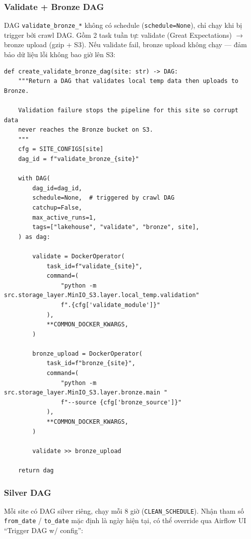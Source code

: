 \subsubsection{Validate + Bronze DAG}

DAG \texttt{validate\_bronze\_*} không có schedule (\texttt{schedule=None}),
chỉ chạy khi bị trigger bởi crawl DAG. Gồm 2 task tuần tự: validate (Great
Expectations) $\to$ bronze upload (gzip + S3). Nếu validate fail, bronze
upload không chạy --- đảm bảo dữ liệu lỗi không bao giờ lên S3:

\begin{lstlisting}[style=pystyle, caption={create\_validate\_bronze\_dag — validate rồi mới upload}]
def create_validate_bronze_dag(site: str) -> DAG:
    """Return a DAG that validates local temp data then uploads to Bronze.

    Validation failure stops the pipeline for this site so corrupt data
    never reaches the Bronze bucket on S3.
    """
    cfg = SITE_CONFIGS[site]
    dag_id = f"validate_bronze_{site}"

    with DAG(
        dag_id=dag_id,
        schedule=None,  # triggered by crawl DAG
        catchup=False,
        max_active_runs=1,
        tags=["lakehouse", "validate", "bronze", site],
    ) as dag:

        validate = DockerOperator(
            task_id=f"validate_{site}",
            command=(
                "python -m src.storage_layer.MinIO_S3.layer.local_temp.validation"
                f".{cfg['validate_module']}"
            ),
            **COMMON_DOCKER_KWARGS,
        )

        bronze_upload = DockerOperator(
            task_id=f"bronze_{site}",
            command=(
                "python -m src.storage_layer.MinIO_S3.layer.bronze.main "
                f"--source {cfg['bronze_source']}"
            ),
            **COMMON_DOCKER_KWARGS,
        )

        validate >> bronze_upload

    return dag
\end{lstlisting}

\subsubsection{Silver DAG}

Mỗi site có DAG silver riêng, chạy mỗi 8 giờ (\texttt{CLEAN\_SCHEDULE}).
Nhận tham số \texttt{from\_date} / \texttt{to\_date} mặc định là ngày hiện tại,
có thể override qua Airflow UI ``Trigger DAG w/ config'':

